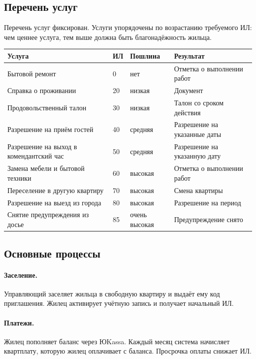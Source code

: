 \documentclass[12pt,a4paper]{article}
\begin{document}
\subsection{Перечень услуг}

Перечень услуг фиксирован. Услуги упорядочены по возрастанию требуемого ИЛ:
чем ценнее услуга, тем выше должна быть благонадёжность жильца.

\begin{longtable}{L{56mm} L{12mm} L{24mm} L{58mm}}
\toprule
\textbf{Услуга} & \textbf{ИЛ} & \textbf{Пошлина} & \textbf{Результат} \\
\midrule
\endhead
\bottomrule
\endfoot
Бытовой ремонт & 0 & нет & Отметка о выполнении работ \\
Справка о проживании & 20 & низкая & Документ \\
Продовольственный талон & 30 & низкая & Талон со сроком действия \\
Разрешение на приём гостей & 40 & средняя & Разрешение на указанные даты \\
Разрешение на выход в комендантский час & 50 & средняя & Разрешение на указанную дату \\
Замена мебели и бытовой техники & 60 & высокая & Отметка о выполнении работ \\
Переселение в другую квартиру & 70 & высокая & Смена квартиры \\
Разрешение на выезд из города & 80 & высокая & Разрешение на период \\
Снятие предупреждения из досье & 85 & очень высокая & Предупреждение снято \\
\end{longtable}

\subsection{Основные процессы}

\paragraph{Заселение.} Управляющий заселяет жильца в свободную квартиру и
выдаёт ему код приглашения. Жилец активирует учётную запись и получает
начальный ИЛ.

\paragraph{Платежи.} Жилец пополняет баланс через ЮKassa. Каждый месяц
система начисляет квартплату, которую жилец оплачивает с баланса. Просрочка
оплаты снижает ИЛ.
\end{document}
